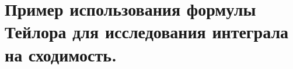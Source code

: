 \documentclass[../main.tex]{subfiles}
\begin{document}
\newpage
\section{Пример использования формулы Тейлора для исследования интеграла на сходимость.}
\end{document}
